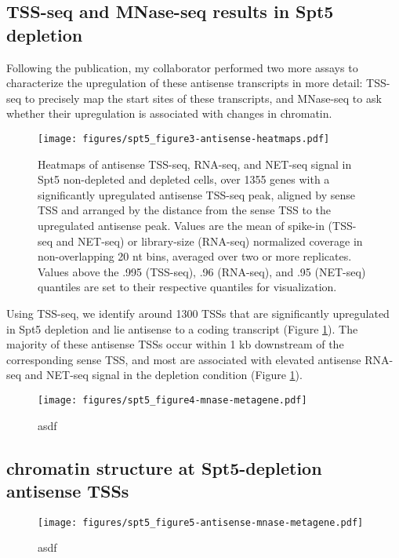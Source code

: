 \documentclass[9pt, letterpaper]{article}
\begin{document}
\subsection{TSS-seq and MNase-seq results in Spt5 depletion}

Following the publication, my collaborator performed two more assays to characterize the upregulation of these antisense transcripts in more detail: TSS-seq to precisely map the start sites of these transcripts, and MNase-seq to ask whether their upregulation is associated with changes in chromatin.

\begin{figure}[H]
\centering
\texttt{[image: figures/spt5\_figure3-antisense-heatmaps.pdf]}
\caption{Heatmaps of antisense TSS-seq, RNA-seq, and NET-seq signal in Spt5 non-depleted and depleted cells, over 1355 genes with a significantly upregulated antisense TSS-seq peak, aligned by sense TSS and arranged by the distance from the sense TSS to the upregulated antisense peak. Values are the mean of spike-in (TSS-seq and NET-seq) or library-size (RNA-seq) normalized coverage in non-overlapping 20 nt bins, averaged over two or more replicates. Values above the .995 (TSS-seq), .96 (RNA-seq), and .95 (NET-seq) quantiles are set to their respective quantiles for visualization.}
\label{fig:spt5_antisense-heatmaps}
\end{figure}

Using TSS-seq, we identify around 1300 TSSs that are significantly upregulated in Spt5 depletion and lie antisense to a coding transcript (Figure \ref{fig:spt5_antisense-heatmaps}). The majority of these antisense TSSs occur within 1 kb downstream of the corresponding sense TSS, and most are associated with elevated antisense RNA-seq and NET-seq signal in the depletion condition (Figure \ref{fig:spt5_antisense-heatmaps}).

\begin{wrapfigure}[23]{l}{8.72cm}
\centering
\texttt{[image: figures/spt5\_figure4-mnase-metagene.pdf]}
\caption{asdf}
\label{fig:spt5_mnase-metagene}
\end{wrapfigure}

\subsection{chromatin structure at Spt5-depletion antisense TSSs}

\begin{wrapfigure}[23]{r}{8.72cm}
\centering
\texttt{[image: figures/spt5\_figure5-antisense-mnase-metagene.pdf]}
\caption{asdf}
\label{fig:spt5_antisense-mnase-metagene}
\end{wrapfigure}

\newpage
{}

\end{document}

